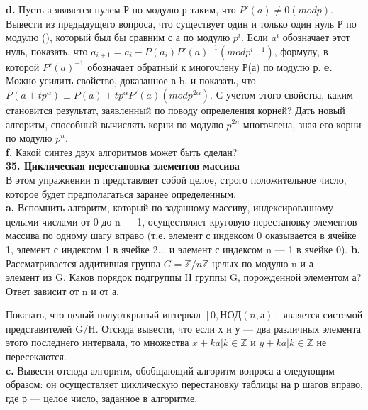 \documentclass{mai_book}
\begin{document}
\textbf{d.} Пусть а является нулем Р по модулю р таким, что $P'(a) \neq 0 (mod p)$. Вывести из предыдущего вопроса, что существует один и только один нуль Р по модулю (), который был бы сравним с а по модулю $p^{i}$. Если $a^{i}$ обозначает этот нуль, показать, что $a_{i+1} = a_{i} - P(a_{i})P'(a)^{-1} (mod p^{i+1})$, формулу, в которой $P'(a)^{-1}$ обозначает обратный к многочлену Р(а) по модулю р.\newline
\textbf{e.} Можно усилить свойство, доказанное в b, и показать, что $P(a + tp^{\alpha}) \equiv P(a) + tp^{\alpha}P'(a) (mod p^{2\alpha})$. С учетом этого свойства, каким становится результат, заявленный по поводу определения корней? Дать новый алгоритм, способный вычислять корни по модулю $p^{2n}$ многочлена, зная его корни по модулю $p^{n}$.\\

\textbf{f.} Какой синтез двух алгоритмов может быть сделан?\\

\noindent
\textbf{35. Циклическая перестановка элементов массива}\\

В этом упражнении n представляет собой целое, строго положительное число, которое будет предполагаться заранее определенным.\\

\textbf{a.} Вспомнить алгоритм, который по заданному массиву, индексированному целыми числами от 0 до n — 1, осуществляет круговую перестановку элементов массива по одному шагу вправо (т.е. элемент с индексом 0 оказывается в ячейке 1, элемент с индексом 1 в ячейке 2... и элемент с индексом n — 1 в ячейке 0).\newline
\hspace*{15pt}\textbf{b.} Рассматривается аддитивная группа $G = \mathbb{Z} / n\mathbb{Z}$  целых по модулю n и а — элемент из G. Каков порядок подгруппы Н группы G, порожденной элементом а? Ответ зависит от n и от а.
\newpage

Показать, что целый полуоткрытый интервал $[0, НОД(n,а)]$ является системой представителей G/H. Отсюда вывести, что если х и у — два различных элемента этого последнего интервала, то множества ${x + ka| k \in \mathbb{Z}}$ и ${y + ka| k \in \mathbb{Z}}$ не пересекаются.\\

\textbf{c.} Вывести отсюда алгоритм, обобщающий алгоритм вопроса а следующим образом: он осуществляет циклическую перестановку таблицы на р шагов вправо, где р — целое число, заданное в алгоритме.\\
\end{document}
